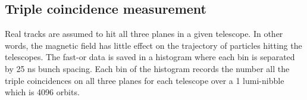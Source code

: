 








\subsection{Triple coincidence measurement}
Real tracks are assumed to hit all three planes in a given telescope. In other words, the magnetic field has little effect on the trajectory of particles hitting the telescopes. The fast-or data is saved in a histogram where each bin is separated by 25 ns bunch spacing. Each bin of the histogram records the number all the triple coincidences on all three planes for each telescope over a 1 lumi-nibble which is 4096 orbits.

